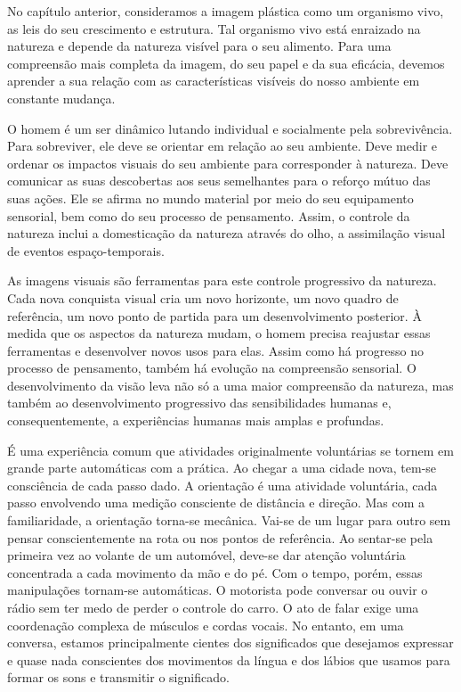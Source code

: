 \documentclass[a4paper]{article}
\begin{document}
No capítulo anterior, consideramos a imagem plástica como um organismo vivo, as leis do seu crescimento e estrutura. Tal organismo vivo está enraizado na natureza e depende da natureza visível para o seu alimento. Para uma compreensão mais completa da imagem, do seu papel e da sua eficácia, devemos aprender a sua relação com as características visíveis do nosso ambiente em constante mudança.

O homem é um ser dinâmico lutando individual e socialmente pela sobrevivência. Para sobreviver, ele deve se orientar em relação ao seu ambiente. Deve medir e ordenar os impactos visuais do seu ambiente para corresponder à natureza. Deve comunicar as suas descobertas aos seus semelhantes para o reforço mútuo das suas ações. Ele se afirma no mundo material por meio do seu equipamento sensorial, bem como do seu processo de pensamento. Assim, o controle da natureza inclui a domesticação da natureza através do olho, a assimilação visual de eventos espaço-temporais.

As imagens visuais são ferramentas para este controle progressivo da natureza. Cada nova conquista visual cria um novo horizonte, um novo quadro de referência, um novo ponto de partida para um desenvolvimento posterior. À medida que os aspectos da natureza mudam, o homem precisa reajustar essas ferramentas e desenvolver novos usos para elas. Assim como há progresso no processo de pensamento, também há evolução na compreensão sensorial. O desenvolvimento da visão leva não só a uma maior compreensão da natureza, mas também ao desenvolvimento progressivo das sensibilidades humanas e, consequentemente, a experiências humanas mais amplas e profundas.

É uma experiência comum que atividades originalmente voluntárias se tornem em grande parte automáticas com a prática. Ao chegar a uma cidade nova, tem-se consciência de cada passo dado. A orientação é uma atividade voluntária, cada passo envolvendo uma medição consciente de distância e direção. Mas com a familiaridade, a orientação torna-se mecânica. Vai-se de um lugar para outro sem pensar conscientemente na rota ou nos pontos de referência. Ao sentar-se pela primeira vez ao volante de um automóvel, deve-se dar atenção voluntária concentrada a cada movimento da mão e do pé. Com o tempo, porém, essas manipulações tornam-se automáticas. O motorista pode conversar ou ouvir o rádio sem ter medo de perder o controle do carro. O ato de falar exige uma coordenação complexa de músculos e cordas vocais. No entanto, em uma conversa, estamos principalmente cientes dos significados que desejamos expressar e quase nada conscientes dos movimentos da língua e dos lábios que usamos para formar os sons e transmitir o significado.
\end{document}

